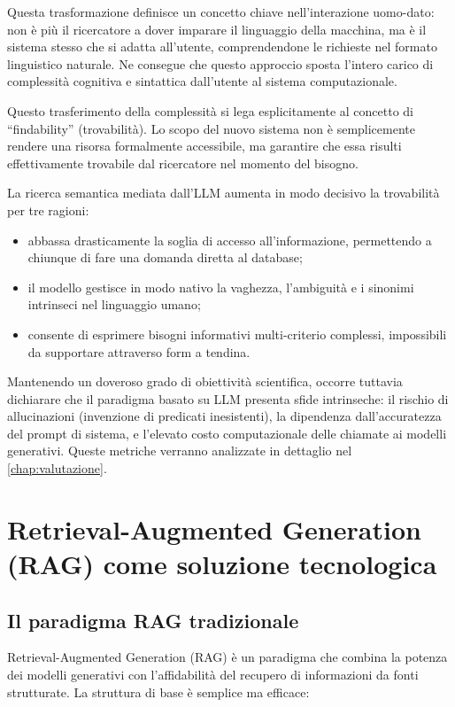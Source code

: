 \documentclass[12pt,a4paper,oneside]{book}
\begin{document}
    Questa trasformazione definisce un concetto chiave nell'interazione uomo-dato: non è più il ricercatore a dover imparare il linguaggio della macchina, ma è il sistema stesso che si adatta all'utente, comprendendone le richieste nel formato linguistico naturale. Ne consegue che questo approccio sposta l'intero carico di complessità cognitiva e sintattica dall'utente al sistema computazionale.

    Questo trasferimento della complessità si lega esplicitamente al concetto di ``findability'' (trovabilità)\cite{Ros07}. Lo scopo del nuovo sistema non è semplicemente rendere una risorsa formalmente accessibile, ma garantire che essa risulti effettivamente trovabile dal ricercatore nel momento del bisogno.

    La ricerca semantica mediata dall'LLM aumenta in modo decisivo la trovabilità per tre ragioni:

    \begin{itemize}
        \item abbassa drasticamente la soglia di accesso all'informazione, permettendo a chiunque di fare una domanda diretta al database;
        \item il modello gestisce in modo nativo la vaghezza, l'ambiguità e i sinonimi intrinseci nel linguaggio umano;
        \item consente di esprimere bisogni informativi multi-criterio complessi, impossibili da supportare attraverso form a tendina.
    \end{itemize}

    Mantenendo un doveroso grado di obiettività scientifica, occorre tuttavia dichiarare che il paradigma basato su LLM presenta sfide intrinseche: il rischio di allucinazioni (invenzione di predicati inesistenti), la dipendenza dall'accuratezza del prompt di sistema, e l'elevato costo computazionale delle chiamate ai modelli generativi. Queste metriche verranno analizzate in dettaglio nel \cref{chap:valutazione}.


\section{Retrieval-Augmented Generation (RAG) come soluzione tecnologica}\label{sec:rag}
    \subsection{Il paradigma RAG tradizionale}\label{subsec:rag_trad}

    Retrieval-Augmented Generation (RAG) è un paradigma che combina la potenza dei modelli generativi con l'affidabilità del recupero di informazioni da fonti strutturate. La struttura di base è semplice ma efficace:
\end{document}
